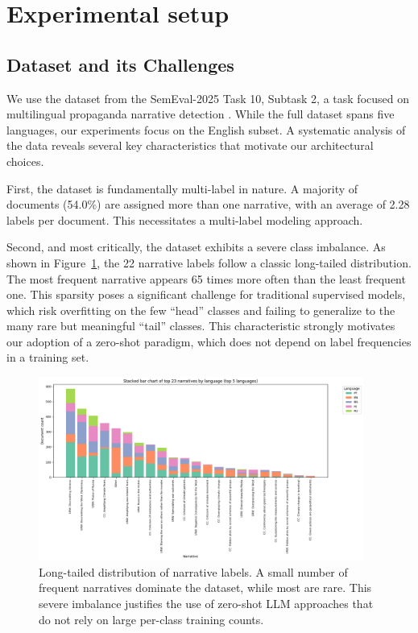 \section{Experimental setup}

\subsection{Dataset and its Challenges}

We use the dataset from the SemEval-2025 Task 10, Subtask 2, a task focused on multilingual propaganda narrative detection \cite{semeval2025task10}. While the full dataset spans five languages, our experiments focus on the English subset. A systematic analysis of the data reveals several key characteristics that motivate our architectural choices.

First, the dataset is fundamentally multi-label in nature. A majority of documents (54.0\%) are assigned more than one narrative, with an average of 2.28 labels per document. This necessitates a multi-label modeling approach.

Second, and most critically, the dataset exhibits a severe class imbalance. As shown in Figure~\ref{fig:narrative_distribution}, the 22 narrative labels follow a classic long-tailed distribution. The most frequent narrative appears 65 times more often than the least frequent one. This sparsity poses a significant challenge for traditional supervised models, which risk overfitting on the few ``head'' classes and failing to generalize to the many rare but meaningful ``tail'' classes. This characteristic strongly motivates our adoption of a zero-shot paradigm, which does not depend on label frequencies in a training set.

\begin{figure}[!ht]
\centering
\includegraphics[width=0.95\textwidth]{assets/images/data_description/narrative_distribution.png}
\caption{Long-tailed distribution of narrative labels. A small number of frequent narratives dominate the dataset, while most are rare. This severe imbalance justifies the use of zero-shot LLM approaches that do not rely on large per-class training counts.}
\label{fig:narrative_distribution}
\end{figure}

